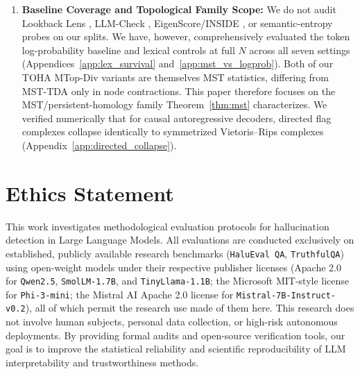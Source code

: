 \documentclass{article}
\begin{document}
\begin{enumerate}
    \item \textbf{Baseline Coverage and Topological Family Scope:} We do not audit Lookback Lens \citep{chuang2024lookback}, LLM-Check \citep{sriramanan2024llmcheck}, EigenScore/INSIDE \citep{chen2024inside}, or semantic-entropy probes \citep{kossen2024semantic} on our splits. We have, however, comprehensively evaluated the token log-probability baseline and lexical controls at full $N$ across all seven settings (Appendices~\ref{app:lex_survival} and~\ref{app:mst_vs_logprob}). Both of our TOHA MTop-Div variants are themselves MST statistics, differing from MST-TDA only in node contractions. This paper therefore focuses on the MST/persistent-homology family Theorem~\ref{thm:mst} characterizes. We verified numerically that for causal autoregressive decoders, directed flag complexes collapse identically to symmetrized Vietoris--Rips complexes (Appendix~\ref{app:directed_collapse}).
\end{enumerate}


\section*{Ethics Statement}
This work investigates methodological evaluation protocols for hallucination detection in Large Language Models. All evaluations are conducted exclusively on established, publicly available research benchmarks (\texttt{HaluEval QA}, \texttt{TruthfulQA}) using open-weight models under their respective publisher licenses (Apache 2.0 for \texttt{Qwen2.5}, \texttt{SmolLM-1.7B}, and \texttt{TinyLlama-1.1B}; the Microsoft MIT-style license for \texttt{Phi-3-mini}; the Mistral AI Apache 2.0 license for \texttt{Mistral-7B-Instruct-v0.2}), all of which permit the research use made of them here. This research does not involve human subjects, personal data collection, or high-risk autonomous deployments. By providing formal audits and open-source verification tools, our goal is to improve the statistical reliability and scientific reproducibility of LLM interpretability and trustworthiness methods.
\end{document}
